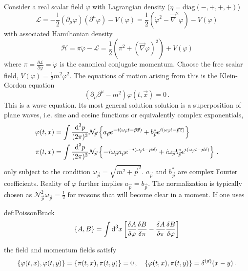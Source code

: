 Consider a real scalar field $\varphi$ with Lagrangian density ($\eta=\text{diag}(-,+,+,+)$)
\begin{equation}
    \mathcal{L}=-\frac{1}{2}(\partial_\mu\varphi)(\partial^\mu\varphi)-V(\varphi)=\frac{1}{2}(\dot{\varphi}^2-\vec{\nabla}^2\varphi)-V(\varphi)
    \label{eq:LagrangianRealScalar}
\end{equation}
with associated Hamiltonian density
\begin{equation}
    \mathcal{H}=\pi\dot{\varphi}-\mathcal{L}=\frac{1}{2}(\pi^2+(\vec{\nabla}\varphi)^2)+V(\varphi)
\end{equation}
where $\pi=\frac{\partial\mathcal{L}}{\partial\dot{\varphi}}=\dot{\varphi}$ is the canonical conjugate momentum. Choose the free scalar field, $V(\varphi)=\frac{1}{2}m^2\varphi^2$. The equations of motion arising from this is the Klein-Gordon equation
\begin{equation}
    (\partial_\mu\partial^\mu-m^2)\varphi(t,\vec{x})=0\,.
    \label{eq:KGEq}
\end{equation}
This is a wave equation. Its most general solution solution is a superposition of plane waves, i.e. sine and cosine functions or equivalently complex exponentials,
\begin{subequations}
    \begin{align}
        \varphi(t,x)               & =\int\frac{\text{d} ^3p}{(2\pi)^3}\mathcal{N}_{\vec{p}}\left\{a_{\vec{p}}e^{-{i}(\omega_{\vec{p}}t-\vec{p}\vec{x})}+b_{\vec{p}}^* e^{{i}(\omega_{\vec{p}}t-\vec{p}\vec{x})}\right\}                                                 \\
        \pi(t,x) & =\int\frac{\text{d} ^3p}{(2\pi)^3}\mathcal{N}_{\vec{p}}\left\{-{i}\omega_{\vec{p}}a_{\vec{p}}e^{-{i}(\omega_{\vec{p}}t-\vec{p}\vec{x})}+{i}\omega_{\vec{p}}b_{\vec{p}}^* e^{{i}(\omega_{\vec{p}}t-\vec{p}\vec{x})}\right\}\,.
    \end{align}
\end{subequations}
only subject to the condition $\omega_{\vec{p}}=\sqrt{m^2+\vec{p}^2}$. $a_{\vec{p}}$ and $b_{\vec{p}}^*$ are complex Fourier coefficients. Reality of $\varphi$ further implies $a_{\vec{p}}=b_{\vec{p}}$. The normalization is typically chosen as $\mathcal{N}_{\vec{p}}^2\omega_{\vec{p}}=\frac{1}{2}$ for reasons that will become clear in a moment. If one uses
\begin{defin}{def:PoissonBrack}
    \begin{equation}
        {\{A,B\}}=\int\text{d}^3x\left[\frac{\delta A}{\delta\varphi}\frac{\delta B}{\delta\pi}-\frac{\delta A}{\delta\pi}\frac{\delta B}{\delta\varphi}\right]
    \end{equation}
\end{defin}
the field and momentum fields satisfy
\begin{equation}
    {\{\varphi(t,x),\varphi(t,y)\}}={\{\pi(t,x),\pi(t,y)\}}=0\,,\quad{\{\varphi(t,x),\pi(t,y)\}}=\delta^{(d)}(x-y)\,.
\end{equation}

